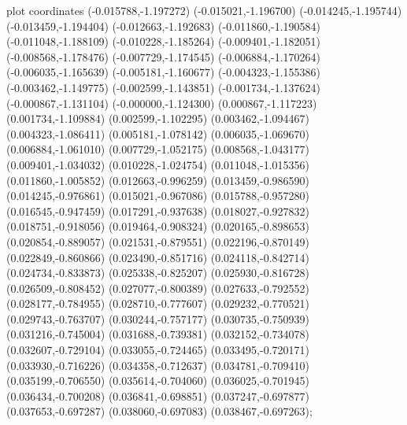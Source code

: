 { plot coordinates {(-0.015788,-1.197272) (-0.015021,-1.196700) (-0.014245,-1.195744) (-0.013459,-1.194404) (-0.012663,-1.192683) (-0.011860,-1.190584) (-0.011048,-1.188109) (-0.010228,-1.185264) (-0.009401,-1.182051) (-0.008568,-1.178476) (-0.007729,-1.174545) (-0.006884,-1.170264) (-0.006035,-1.165639) (-0.005181,-1.160677) (-0.004323,-1.155386) (-0.003462,-1.149775) (-0.002599,-1.143851) (-0.001734,-1.137624) (-0.000867,-1.131104) (-0.000000,-1.124300) (0.000867,-1.117223) (0.001734,-1.109884) (0.002599,-1.102295) (0.003462,-1.094467) (0.004323,-1.086411) (0.005181,-1.078142) (0.006035,-1.069670) (0.006884,-1.061010) (0.007729,-1.052175) (0.008568,-1.043177) (0.009401,-1.034032) (0.010228,-1.024754) (0.011048,-1.015356) (0.011860,-1.005852) (0.012663,-0.996259) (0.013459,-0.986590) (0.014245,-0.976861) (0.015021,-0.967086) (0.015788,-0.957280) (0.016545,-0.947459) (0.017291,-0.937638) (0.018027,-0.927832) (0.018751,-0.918056) (0.019464,-0.908324) (0.020165,-0.898653) (0.020854,-0.889057) (0.021531,-0.879551) (0.022196,-0.870149) (0.022849,-0.860866) (0.023490,-0.851716) (0.024118,-0.842714) (0.024734,-0.833873) (0.025338,-0.825207) (0.025930,-0.816728) (0.026509,-0.808452) (0.027077,-0.800389) (0.027633,-0.792552) (0.028177,-0.784955) (0.028710,-0.777607) (0.029232,-0.770521) (0.029743,-0.763707) (0.030244,-0.757177) (0.030735,-0.750939) (0.031216,-0.745004) (0.031688,-0.739381) (0.032152,-0.734078) (0.032607,-0.729104) (0.033055,-0.724465) (0.033495,-0.720171) (0.033930,-0.716226) (0.034358,-0.712637) (0.034781,-0.709410) (0.035199,-0.706550) (0.035614,-0.704060) (0.036025,-0.701945) (0.036434,-0.700208) (0.036841,-0.698851) (0.037247,-0.697877) (0.037653,-0.697287) (0.038060,-0.697083) (0.038467,-0.697263)};
}
